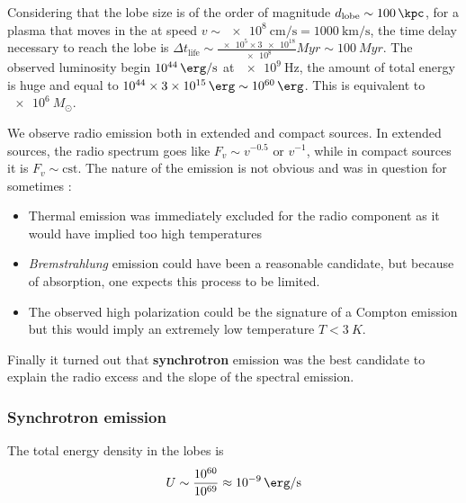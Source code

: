 \documentclass[10pt,a4paper,english]{article}
\begin{document}
Considering that the lobe size is of the order of magnitude
$d_\mathrm{lobe}\sim \SI{100}{\kpc}$, for a plasma that moves in the at speed
$v\sim \SI{e8}{\cm\per\s} = \SI{1000}{\km\per\s}$, the time delay necessary to
reach the lobe is $\Delta t_\mathrm{life} \sim
\frac{\num{e5}\times\num{3e18}}{\num{e8}} \si{Myr} \sim \SI{100}{Myr}$. The
observed luminosity begin $\SI{e44}{\erg\per\s}$ at $\SI{e9}{\Hz}$, the amount
of total energy is huge and equal to $\num{e44}\times\SI{3e15}{\erg} \sim
\SI{e60}{\erg}$. This is equivalent to $\SI{e6}{M_\odot}$.

We observe radio emission both in extended and compact sources. In extended
sources, the radio spectrum goes like $F_v \sim v^{-0.5} \textrm{ or } v^{-1}$,
while in compact sources it is $F_v \sim \mathrm{cst}$. The nature of the
emission is not obvious and was in question for sometimes :
\begin{itemize}
    \item Thermal emission was immediately excluded for the radio component as
          it would have implied too high temperatures
    \item \emph{Bremstrahlung} emission could have been a reasonable candidate,
          but because of absorption, one expects this process to be limited.
    \item The observed high polarization could be the signature of a Compton
          emission but this would imply an extremely low temperature $T <
          \SI{3}{K}$.
\end{itemize}

Finally it turned out that \textbf{synchrotron} emission was the best candidate
to explain the radio excess and the slope of the spectral emission.

\subsubsection{Synchrotron emission}

The total energy density in the lobes is
\begin{equation}
    U \sim \frac{10^{60}}{10^{69}} \approx \SI{e-9}{\erg\per\s}
\end{equation}
\end{document}
